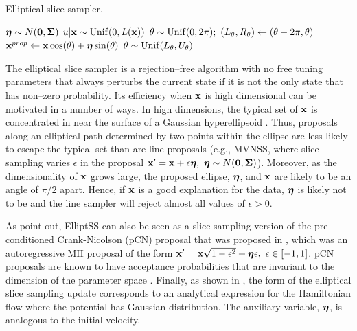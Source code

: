 \begin{algorithm}[htbp]
	\caption{Elliptical slice sampler.}\label{alg:elliptical_slice_sampler}
	\begin{algorithmic}[1]
		\State $ \boldsymbol{\eta} \sim N(\boldsymbol{0}, \boldsymbol{\Sigma}) $ 
		\State $ u|\mathbf{x} \sim \mathrm{Unif}(0, L(\mathbf{x})) $ 
		\State $\theta \sim \mr{Unif}(0,2\pi);\ 
		(L_{\theta}, R_\theta) \gets (\theta - 2\pi, \theta)$ 
		\State $ \mathbf{x} ^{prop}\gets\mathbf{x}\cos(\theta) + \boldsymbol{\eta}\sin(\theta) $ 
		\If{$ L(\prop{\bx}) > u $}{ $ \new{\bx}\gets\prop{\bx} $}\Comment{Accept proposal}
		\State\Return{ $ \new{\bx} $}
		\Else{}
		\EndIf
		\State $ \theta\sim\mathrm{Unif}(L_\theta,U_\theta) $ 
		\State{\textbf{GoTo} 5} 
		\EndIf
		\EndProcedure
	\end{algorithmic}
\end{algorithm}

The elliptical slice sampler is a rejection--free algorithm with no free tuning parameters that always perturbs the current state if it is not the only state that has non--zero probability. Its efficiency when $ \mathbf{x} $ is high dimensional can be motivated in a number of ways. In high dimensions, the typical set of $ \mathbf{x} $ is concentrated in near the surface of a Gaussian hyperellipsoid \cite{betancourt2017conceptual,murray2010}. Thus, proposals along an elliptical path determined by two points within the ellipse are less likely to escape the typical set than are line proposals (e.g., MVNSS, where slice sampling varies $ \epsilon $ in the proposal $ \bx' = \bx + \epsilon\boeta,\ \boeta \sim N(\bs{0},\bSigma)$). Moreover, as the dimensionality of $ \mathbf{x} $ grows large, the proposed ellipse, $ \boldsymbol{\eta} $, and $ \mathbf{x} $ are likely to be an angle of $ \pi/2 $ apart. Hence, if $ \mathbf{x} $ is a good explanation for the data, $ \boldsymbol{\eta} $ is likely not to be and the line sampler will reject almost all values of $ \epsilon>0 $. 

As \cite{murray2010} point out, ElliptSS can also be seen as a slice sampling version of the pre-conditioned Crank-Nicolson (pCN) proposal that was proposed in \cite{neal1998regression}, which was an autoregressive MH proposal of the form  $ \mathbf{x}' = \mathbf{x}\sqrt{1-\epsilon^2} + \boldsymbol{\eta}\epsilon,\ \epsilon\in[-1,1] $. pCN proposals are known to have acceptance probabilities that are invariant to the dimension of the parameter space \cite{cotter2013mcmc}. Finally, as shown in \cite{bloem2016slice}, the form of the elliptical slice sampling update corresponds to an analytical expression for the Hamiltonian flow where the potential has Gaussian distribution. The auxiliary variable, $ \boldsymbol{\eta} $, is analogous to the initial velocity. 

